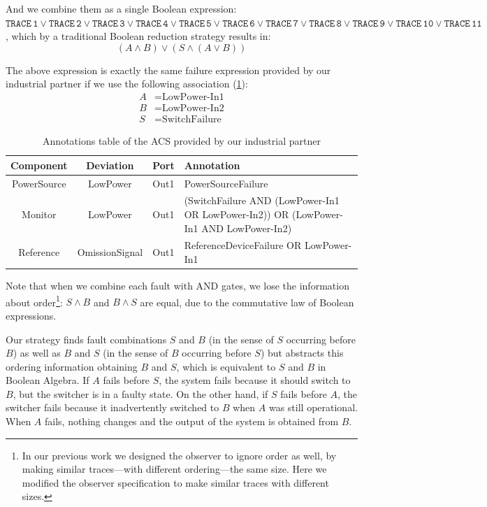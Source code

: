 \documentclass[12pt,openright,twoside,a4paper,oldfontcommands,english,brazil,final]{abntex2}
\theoremstyle{theo}
\def\embraer{%
  our industrial partner%
  \xspace%
}
\begin{document}
And we combine them as a single Boolean expression:
%
$\mathtt{TRACE\,1} \lor \mathtt{TRACE\,2} \lor \mathtt{TRACE\,3} \lor \mathtt{TRACE\,4} \lor \mathtt{TRACE\,5} \lor \mathtt{TRACE\,6} \lor \mathtt{TRACE\,7} \lor \mathtt{TRACE\,8} \lor \mathtt{TRACE\,9} \lor \mathtt{TRACE\,10} \lor \mathtt{TRACE\,11}$, %
which by a traditional Boolean reduction strategy results in:
%
\[(A \land B) \lor (S \land (A \lor B))\]

\begin{sloppypar}
The above expression is exactly the same failure expression provided by \embraer if we use the following association (\cref{tbl:acsAnnotations}):
\begin{align*}
A &= \text{LowPower-In1}\\
B &= \text{LowPower-In2}\\
S &= \text{SwitchFailure}
\end{align*}
\end{sloppypar}

\begin{table}[t]
\renewcommand{\arraystretch}{1.3}
\caption{Annotations table of the ACS provided by \embraer}
\label{tbl:acsAnnotations}
\centering
\begin{tabularx}{\linewidth}{|c|c|c|X|}
\hline
\bfseries Component & \bfseries Deviation & \bfseries Port & \bfseries Annotation \\
\hline
PowerSource & LowPower & Out1 & PowerSourceFailure\\
\hline
Monitor & LowPower & Out1 & (SwitchFailure AND (LowPower-In1 OR LowPower-In2)) OR (LowPower-In1 AND LowPower-In2) \\
\hline
Reference & OmissionSignal & Out1 & ReferenceDeviceFailure OR LowPower-In1\\
\hline
\end{tabularx}
\end{table}

Note that when we combine each fault with \ac{AND} gates, we lose the information about order\footnote{In our previous work we designed the observer to ignore order as well, by making similar traces---with different ordering---the same size. Here we modified the observer specification to make similar traces with different sizes.}: $S \land B$ and $B \land S$ are equal, due to the commutative law of Boolean expressions.

Our strategy finds fault combinations $S$ and $B$ (in the sense of $S$ occurring before $B$) as well as $B$ and $S$ (in the sense of $B$ occurring before $S$) but abstracts this ordering information obtaining $B$ and $S$, which is equivalent to $S$ and $B$ in Boolean Algebra.
%
If $A$ fails before $S$, the system fails because it should switch to $B$, but the switcher is in a faulty state.
%
On the other hand, if $S$ fails before $A$, the switcher fails because it inadvertently switched to $B$ when $A$ was still operational.
%
When $A$ fails, nothing changes and the output of the system is obtained from $B$.
\end{document}
